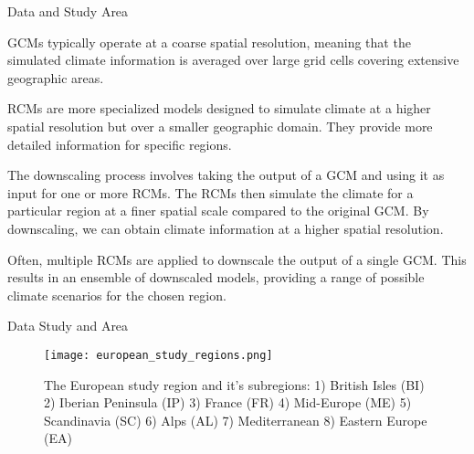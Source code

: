 \documentclass[xcolor={dvipsnames}]{beamer}
\begin{document}
\begin{frame}{Data and Study Area} 

GCMs typically operate at a coarse spatial resolution, meaning that the simulated climate information is averaged over large grid cells covering extensive geographic areas.

\pause

\hfill

RCMs are more specialized models designed to simulate climate at a higher spatial resolution but over a smaller geographic domain. They provide more detailed information for specific regions.

\pause

\hfill

The downscaling process involves taking the output of a GCM and using it as input for one or more RCMs. The RCMs then simulate the climate for a particular region at a finer spatial scale compared to the original GCM. By downscaling, we can obtain climate information at a higher spatial resolution.

\pause

\hfill

Often, multiple RCMs are applied to downscale the output of a single GCM. This results in an ensemble of downscaled models, providing a range of possible climate scenarios for the chosen region.

\end{frame}

\begin{frame}{Data Study and Area}

\begin{figure}
    \centering
    \texttt{[image: european\_study\_regions.png]}
    \setlength{\abovecaptionskip}{0pt}
    \caption*{\tiny{The European study region and it’s subregions: 1) British Isles (BI) 2) Iberian Peninsula (IP) 3) France (FR) 4) Mid-Europe (ME) 5) Scandinavia (SC) 6) Alps (AL) 7) Mediterranean 8) Eastern Europe (EA)}}
    \label{fig:european_study_regions}
\end{figure}

\end{frame}
\end{document}
